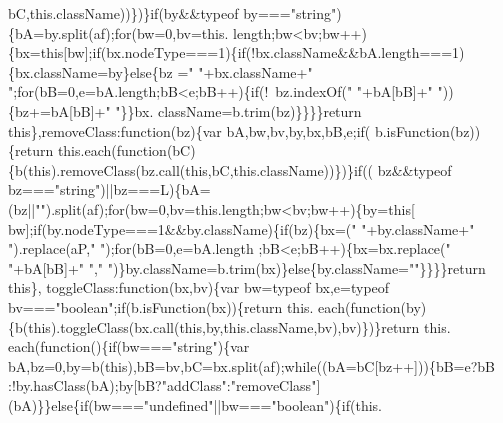 \begin{DoxyCode}
      bC,\textcolor{keyword}{this}.className))\})\}\textcolor{keywordflow}{if}(by&&typeof by===\textcolor{stringliteral}{"string"})\{bA=by.split(af);\textcolor{keywordflow}{for}(bw=0,bv=this.
      length;bw<bv;bw++)\{bx=\textcolor{keyword}{this}[bw];\textcolor{keywordflow}{if}(bx.nodeType===1)\{\textcolor{keywordflow}{if}(!bx.className&&bA.length===1)\{bx.className=by\}\textcolor{keywordflow}{else}\{bz
      =\textcolor{stringliteral}{" "}+bx.className+\textcolor{stringliteral}{" "};\textcolor{keywordflow}{for}(bB=0,e=bA.length;bB<e;bB++)\{\textcolor{keywordflow}{if}(!~bz.indexOf(\textcolor{stringliteral}{" "}+bA[bB]+\textcolor{stringliteral}{" "}))\{bz+=bA[bB]+\textcolor{stringliteral}{" "}\}\}bx.
      className=b.trim(bz)\}\}\}\}\textcolor{keywordflow}{return} \textcolor{keyword}{this}\},removeClass:\textcolor{keyword}{function}(bz)\{var bA,bw,bv,by,bx,bB,e;\textcolor{keywordflow}{if}(
      b.isFunction(bz))\{\textcolor{keywordflow}{return} this.each(\textcolor{keyword}{function}(bC)\{b(\textcolor{keyword}{this}).removeClass(bz.call(\textcolor{keyword}{this},bC,\textcolor{keyword}{this}.className))\})\}\textcolor{keywordflow}{if}((
      bz&&typeof bz===\textcolor{stringliteral}{"string"})||bz===L)\{bA=(bz||\textcolor{stringliteral}{""}).split(af);\textcolor{keywordflow}{for}(bw=0,bv=this.length;bw<bv;bw++)\{by=\textcolor{keyword}{this}[
      bw];\textcolor{keywordflow}{if}(by.nodeType===1&&by.className)\{\textcolor{keywordflow}{if}(bz)\{bx=(\textcolor{stringliteral}{" "}+by.className+\textcolor{stringliteral}{" "}).replace(aP,\textcolor{stringliteral}{" "});\textcolor{keywordflow}{for}(bB=0,e=bA.length
      ;bB<e;bB++)\{bx=bx.replace(\textcolor{stringliteral}{" "}+bA[bB]+\textcolor{stringliteral}{" "},\textcolor{stringliteral}{" "})\}by.className=b.trim(bx)\}\textcolor{keywordflow}{else}\{by.className=\textcolor{stringliteral}{""}\}\}\}\}\textcolor{keywordflow}{return} \textcolor{keyword}{this}\},
      toggleClass:\textcolor{keyword}{function}(bx,bv)\{var bw=typeof bx,e=typeof bv===\textcolor{stringliteral}{"boolean"};\textcolor{keywordflow}{if}(b.isFunction(bx))\{\textcolor{keywordflow}{return} this.
      each(\textcolor{keyword}{function}(by)\{b(\textcolor{keyword}{this}).toggleClass(bx.call(\textcolor{keyword}{this},by,\textcolor{keyword}{this}.className,bv),bv)\})\}\textcolor{keywordflow}{return} this.
      each(\textcolor{keyword}{function}()\{\textcolor{keywordflow}{if}(bw===\textcolor{stringliteral}{"string"})\{var bA,bz=0,by=b(\textcolor{keyword}{this}),bB=bv,bC=bx.split(af);\textcolor{keywordflow}{while}((bA=bC[bz++]))\{bB=e?bB
      :!by.hasClass(bA);by[bB?\textcolor{stringliteral}{"addClass"}:\textcolor{stringliteral}{"removeClass"}](bA)\}\}\textcolor{keywordflow}{else}\{\textcolor{keywordflow}{if}(bw===\textcolor{stringliteral}{"undefined"}||bw===\textcolor{stringliteral}{"boolean"})\{\textcolor{keywordflow}{if}(this.

\end{DoxyCode}
